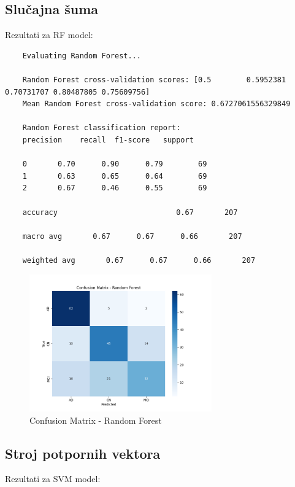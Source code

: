 \documentclass[zavrsnirad]{fer}
\begin{document}
\subsection{Slučajna šuma}

Rezultati za RF model:

\begin{verbatim}
	Evaluating Random Forest...
	
	Random Forest cross-validation scores: [0.5        0.5952381  0.70731707 0.80487805 0.75609756]
	Mean Random Forest cross-validation score: 0.6727061556329849
	
	Random Forest classification report:
	precision    recall  f1-score   support
	
	0       0.70      0.90      0.79        69
	1       0.63      0.65      0.64        69
	2       0.67      0.46      0.55        69
	
	accuracy                           0.67       207
	
	macro avg       0.67      0.67      0.66       207
	
	weighted avg       0.67      0.67      0.66       207
\end{verbatim}

\begin{figure}[h]
	\centering
	\includegraphics[width=0.7\textwidth]{Figures/matrix_rf_2.png}
	\caption{Confusion Matrix - Random Forest}
	\label{fig:matrix_rf}
\end{figure}

\subsection{Stroj potpornih vektora}

Rezultati za SVM model:
\end{document}

